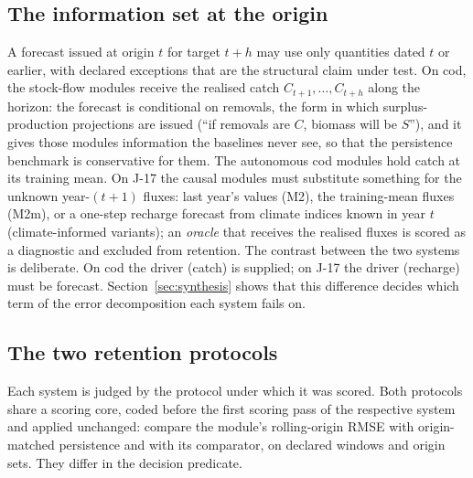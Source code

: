 \subsection{The information set at the origin}\label{sec:info}

A forecast issued at origin $t$ for target $t+h$ may use only quantities dated $t$ or earlier, with declared exceptions that are the structural claim under test. On cod, the stock-flow modules receive the realised catch $C_{t+1},\dots,C_{t+h}$ along the horizon: the forecast is conditional on removals, the form in which surplus-production projections are issued (``if removals are $C$, biomass will be $S$''), and it gives those modules information the baselines never see, so that the persistence benchmark is conservative for them. The autonomous cod modules hold catch at its training mean. On J-17 the causal modules must substitute something for the unknown year-$(t+1)$ fluxes: last year's values (M2), the training-mean fluxes (M2m), or a one-step recharge forecast from climate indices known in year $t$ (climate-informed variants); an \emph{oracle} that receives the realised fluxes is scored as a diagnostic and excluded from retention. The contrast between the two systems is deliberate. On cod the driver (catch) is supplied; on J-17 the driver (recharge) must be forecast. Section~\ref{sec:synthesis} shows that this difference decides which term of the error decomposition each system fails on.

\subsection{The two retention protocols}\label{sec:protocols}

Each system is judged by the protocol under which it was scored. Both protocols share a scoring core, coded before the first scoring pass of the respective system and applied unchanged: compare the module's rolling-origin RMSE with origin-matched persistence and with its comparator, on declared windows and origin sets. They differ in the decision predicate.

